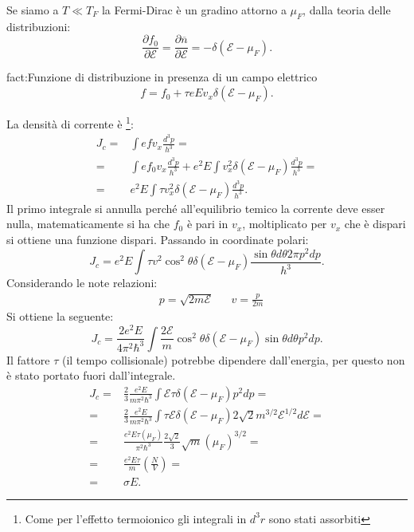 Se siamo a $T\ll T_F$ la Fermi-Dirac è un gradino attorno a $\mu_F$, dalla teoria delle distribuzioni:
\[
	\frac{\partial f_0}{\partial \mathcal{E} } 
	=
	\frac{\partial \overline{n}}{\partial \mathcal{E} } 
	=
	- \delta ( \mathcal{E} - \mu_F) 
.\] 
\begin{fact}{fact:Funzione di distribuzione in presenza di un campo elettrico}
	\[
		f 
		= 
		f_0
		+
		\tau e E v_x 
		\delta ( \mathcal{E} - \mu_F) 
	.\] 
\end{fact}
La densità di corrente è \footnote{Come per l'effetto termoionico gli integrali in $d^3r$ sono stati assorbiti}:
\[\begin{aligned}
	J_c 
	=&
	\int e f v_x \frac{d^3p}{h^3}= \\
	=& 
	\int e f_0 v_x \frac{d^3p}{h^3}
	+ 
	e^2 E 
	\int v_x^2 \delta ( \mathcal{E} -\mu_F) \frac{d^3p}{h^3}=\\
	=&
	e^2 E 
	\int \tau v_x^2 \delta ( \mathcal{E} -\mu_F) \frac{d^3p}{h^3}
.\end{aligned}\]
Il primo integrale si annulla perché all'equilibrio temico la corrente deve esser nulla, matematicamente si ha che $f_0$ è pari in $v_x$, moltiplicato per $v_x$ che è dispari si ottiene una funzione dispari.
Passando in coordinate polari:
\[
	J_c 
	=
	e^2 E 
	\int \tau v^2\cos^2\theta \delta ( \mathcal{E} -\mu_F) 
		\frac{\sin\theta d\theta 2\pi p^2 dp }{h^3}
.\] 
Considerando le note relazioni:
\begin{align}
	& p = \sqrt{2m\mathcal{E} } &
	& v=\frac{p}{2m}
\end{align}
Si ottiene la seguente:
\[
	J_c 
	=
	\frac{2e^2E}{4\pi^2\hbar^3}
	\int \frac{2\mathcal{E} }{m}
		\cos^2\theta  \delta ( \mathcal{E} -\mu _F) 
		\sin\theta d\theta p^2 dp
.\] 
Il fattore $\tau $ (il tempo collisionale) potrebbe dipendere dall'energia, per questo non è stato portato fuori dall'integrale.
\[\begin{aligned}
	J_c 
	=&
	\frac{2}{3}\frac{e^2E}{m\pi^2\hbar^3}
	\int \mathcal{E} \tau \delta ( \mathcal{E} -\mu_F) 
	p^2 dp=\\
	=&
	\frac{2}{3}\frac{e^2E}{m\pi^2\hbar^3}
	\int \tau \mathcal{E} \delta ( \mathcal{E} -\mu_F) 
	2\sqrt{2} m^{3 /2} \mathcal{E}^{1 /2} d\mathcal{E} =\\
	=&
	\frac{e^2E\tau ( \mu_F) }{\pi^2\hbar^3}
	\frac{2\sqrt{2} }{3}\sqrt{m} \left( \mu_F \right) ^{3 /2}=\\
	=&
	\frac{e^2E\tau }{m}\left( \frac{N}{V} \right) =\\
	=& 
	\sigma E
.\end{aligned}\]
